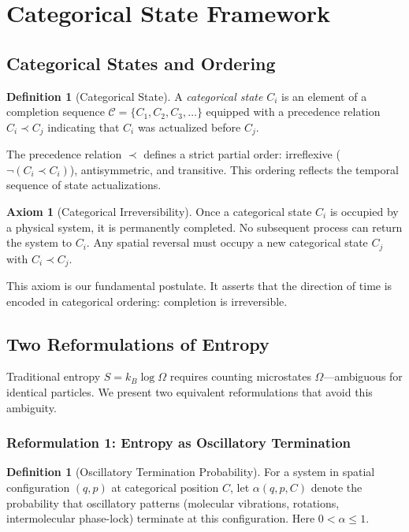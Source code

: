 \documentclass[twocolumn,superscriptaddress,prb,10pt]{revtex4-2}
\theoremstyle{definition}
\newtheorem{definition}[theorem]{Definition}
\newtheorem{axiom}[theorem]{Axiom}
\theoremstyle{remark}
\begin{document}
\section{Categorical State Framework}

\subsection{Categorical States and Ordering}

\begin{definition}[Categorical State]
A \emph{categorical state} $C_i$ is an element of a completion sequence $\mathcal{C} = \{C_1, C_2, C_3, \ldots\}$ equipped with a precedence relation $C_i \prec C_j$ indicating that $C_i$ was actualized before $C_j$.
\end{definition}

The precedence relation $\prec$ defines a strict partial order: irreflexive ($\neg(C_i \prec C_i)$), antisymmetric, and transitive. This ordering reflects the temporal sequence of state actualizations.

\begin{axiom}[Categorical Irreversibility]
\label{ax:irreversibility}
Once a categorical state $C_i$ is occupied by a physical system, it is permanently completed. No subsequent process can return the system to $C_i$. Any spatial reversal must occupy a new categorical state $C_j$ with $C_i \prec C_j$.
\end{axiom}

This axiom is our fundamental postulate. It asserts that the direction of time is encoded in categorical ordering: completion is irreversible.

\subsection{Two Reformulations of Entropy}

Traditional entropy $S = k_B \log \Omega$ requires counting microstates $\Omega$—ambiguous for identical particles. We present two equivalent reformulations that avoid this ambiguity.

\subsubsection{Reformulation 1: Entropy as Oscillatory Termination}

\begin{definition}[Oscillatory Termination Probability]
\label{def:alpha}
For a system in spatial configuration $(q,p)$ at categorical position $C$, let $\alpha(q,p,C)$ denote the probability that oscillatory patterns (molecular vibrations, rotations, intermolecular phase-lock) terminate at this configuration. Here $0 < \alpha \leq 1$.
\end{definition}
\end{document}

